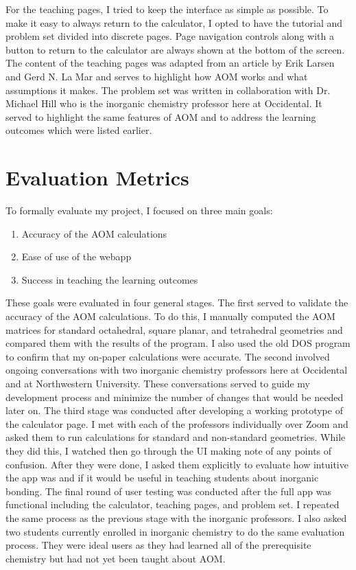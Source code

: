 \documentclass[10pt,twocolumn]{article}
\begin{document}
For the teaching pages, I tried to keep the interface as simple as possible. To make it easy to always return to the calculator, I opted to have the tutorial and problem set divided into discrete pages. Page navigation controls along with a button to return to the calculator are always shown at the bottom of the screen. The content of the teaching pages was adapted from an article by Erik Larsen and Gerd N. La Mar and serves to highlight how AOM works and what assumptions it makes. The problem set was written in collaboration with Dr. Michael Hill who is the inorganic chemistry professor here at Occidental. It served to highlight the same features of AOM and to address the learning outcomes which were listed earlier.

\section{Evaluation Metrics}
To formally evaluate my project, I focused on three main goals:
\begin{enumerate}
	\item Accuracy of the AOM calculations
	\item Ease of use of the webapp
	\item Success in teaching the learning outcomes
\end{enumerate}

These goals were evaluated in four general stages. The first served to validate the accuracy of the AOM calculations. To do this, I manually computed the AOM matrices for standard octahedral, square planar, and tetrahedral geometries and compared them with the results of the program. I also used the old DOS program to confirm that my on-paper calculations were accurate. The second involved ongoing conversations with two inorganic chemistry professors here at Occidental and at Northwestern University. These conversations served to guide my development process and minimize the number of changes that would be needed later on. The third stage was conducted after developing a working prototype of the calculator page. I met with each of the professors individually over Zoom and asked them to run calculations for standard and non-standard geometries. While they did this, I watched then go through the UI making note of any points of confusion. After they were done, I asked them explicitly to evaluate how intuitive the app was and if it would be useful in teaching students about inorganic bonding. The final round of user testing was conducted after the full app was functional including the calculator, teaching pages, and problem set. I repeated the same process as the previous stage with the inorganic professors. I also asked two students currently enrolled in inorganic chemistry to do the same evaluation process. They were ideal users as they had learned all of the prerequisite chemistry but had not yet been taught about AOM. 
\end{document}
